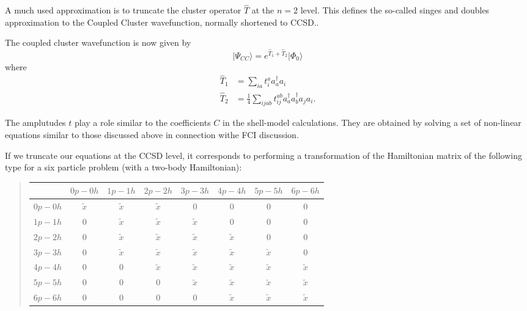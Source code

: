 A much used approximation is to  truncate the cluster operator $\hat{T}$ at the $n=2$ level. This defines the so-called singes and doubles approximation to the Coupled Cluster wavefunction, normally shortened to CCSD..

The coupled cluster wavefunction is now given by
\begin{equation*}
            \vert \Psi_{CC}\rangle = e^{\hat{T}_1 + \hat{T}_2} \vert \Phi_0\rangle
\end{equation*}
where 
        \begin{align*}
            \hat{T}_1 &= 
            \sum_{ia}
                t_{i}^{a} a_{a}^\dagger a_i \\
            \hat{T}_2 &= \frac{1}{4} 
            \sum_{ijab}
                t_{ij}^{ab} a_{a}^\dagger a_{b}^\dagger a_{j} a_{i}.
        \end{align*}

The amplutudes $t$ play a role similar to the coefficients $C$ in the shell-model calculations. They are obtained by solving a set of non-linear equations
similar to those discussed above in connection withe FCI discussion.

If we truncate our equations at the CCSD level, it corresponds to performing a transformation of the Hamiltonian matrix of the following type for a six particle problem (with a two-body Hamiltonian):


\begin{quote}
\begin{tabular}{cccccccc}
\hline
\multicolumn{1}{c}{  } & \multicolumn{1}{c}{ $0p-0h$ } & \multicolumn{1}{c}{ $1p-1h$ } & \multicolumn{1}{c}{ $2p-2h$ } & \multicolumn{1}{c}{ $3p-3h$ } & \multicolumn{1}{c}{ $4p-4h$ } & \multicolumn{1}{c}{ $5p-5h$ } & \multicolumn{1}{c}{ $6p-6h$ } \\
\hline
$0p-0h$ & $\tilde{x}$ & $\tilde{x}$ & $\tilde{x}$ & 0           & 0           & 0           & 0           \\
$1p-1h$ & 0           & $\tilde{x}$ & $\tilde{x}$ & $\tilde{x}$ & 0           & 0           & 0           \\
$2p-2h$ & 0           & $\tilde{x}$ & $\tilde{x}$ & $\tilde{x}$ & $\tilde{x}$ & 0           & 0           \\
$3p-3h$ & 0           & $\tilde{x}$ & $\tilde{x}$ & $\tilde{x}$ & $\tilde{x}$ & $\tilde{x}$ & 0           \\
$4p-4h$ & 0           & 0           & $\tilde{x}$ & $\tilde{x}$ & $\tilde{x}$ & $\tilde{x}$ & $\tilde{x}$ \\
$5p-5h$ & 0           & 0           & 0           & $\tilde{x}$ & $\tilde{x}$ & $\tilde{x}$ & $\tilde{x}$ \\
$6p-6h$ & 0           & 0           & 0           & 0           & $\tilde{x}$ & $\tilde{x}$ & $\tilde{x}$ \\
\hline
\end{tabular}
\end{quote}

